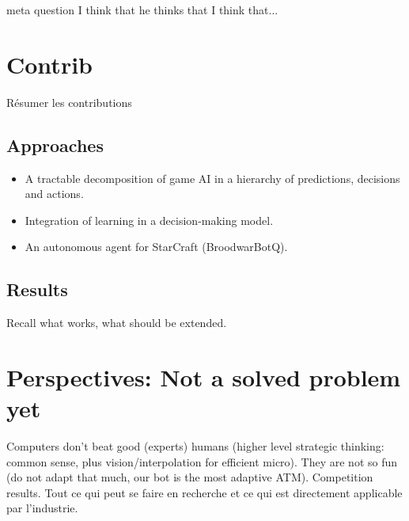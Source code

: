 meta question I think that he thinks that I think that...
\citep{RussellW89}
\citep{metaMCTS}

\section{Contrib}
Résumer les contributions
\subsection{Approaches}
\begin{itemize}
\item A tractable decomposition of game AI in a hierarchy of predictions, decisions and actions.
\item Integration of learning in a decision-making model. 
\item An autonomous agent for StarCraft (BroodwarBotQ).
\end{itemize}

\subsection{Results}
Recall what works, what should be extended.

\section{Perspectives: Not a solved problem yet}
Computers don't beat good (experts) humans (higher level strategic thinking: common sense, plus vision/interpolation for efficient micro). They are not so fun (do not adapt that much, our bot is the most adaptive ATM). Competition results.
Tout ce qui peut se faire en recherche et ce qui est directement applicable par l'industrie.



